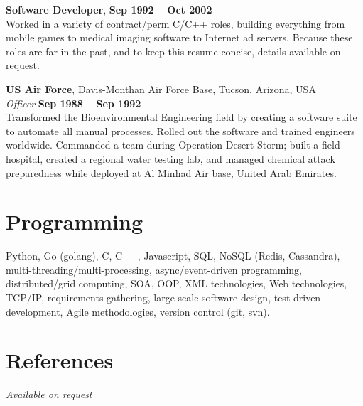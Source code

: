 \documentclass[margin,line]{resume}
\begin{document}
\begin{resume}
    \textbf{Software Developer},  \hfill \textbf{Sep 1992 -- Oct 2002}\\
	Worked in a variety of contract/perm C/C++ roles, building everything from mobile games to medical imaging software to Internet ad servers. Because these roles are far in the past, and to keep this resume concise, details available on request. 
	
    \textbf{US Air Force}, Davis-Monthan Air Force Base, Tucson, Arizona, USA \vspace{2mm}\\\vspace{1mm}%
    \textsl{Officer} \hfill \textbf{Sep 1988 -- Sep 1992}\\
	Transformed the Bioenvironmental Engineering field by creating a software suite to automate all manual processes. 
	Rolled out the software and trained engineers worldwide. Commanded a team during Operation Desert Storm; built
	a field hospital, created a regional water testing lab, and managed chemical attack preparedness while deployed
	at Al Minhad Air base, United Arab Emirates.
	
	
    \section{\mysidestyle Programming} 

    Python, Go (golang), C, C++, Javascript, SQL, NoSQL (Redis, Cassandra), multi-threading/multi-processing, 
    async/event-driven programming, distributed/grid computing, SOA, OOP, XML technologies, 
    Web technologies, TCP/IP, requirements gathering, large scale software design, test-driven development, 
    Agile methodologies, version control (git, svn).

    \section{\mysidestyle References} 
    {\sl Available on request}



\end{resume}
\end{document}
